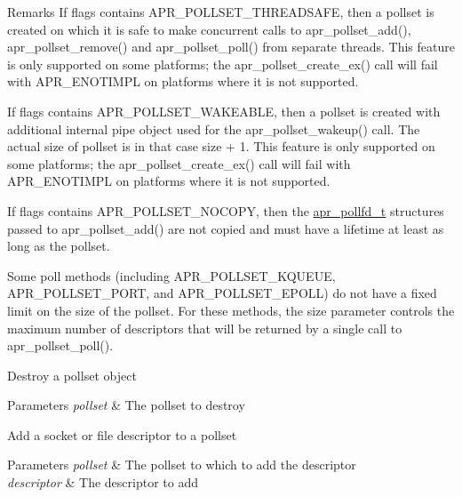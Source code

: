 \begin{DoxyRemark}{Remarks}
If flags contains A\+P\+R\+\_\+\+P\+O\+L\+L\+S\+E\+T\+\_\+\+T\+H\+R\+E\+A\+D\+S\+A\+FE, then a pollset is created on which it is safe to make concurrent calls to apr\+\_\+pollset\+\_\+add(), apr\+\_\+pollset\+\_\+remove() and apr\+\_\+pollset\+\_\+poll() from separate threads. This feature is only supported on some platforms; the apr\+\_\+pollset\+\_\+create\+\_\+ex() call will fail with A\+P\+R\+\_\+\+E\+N\+O\+T\+I\+M\+PL on platforms where it is not supported. 

If flags contains A\+P\+R\+\_\+\+P\+O\+L\+L\+S\+E\+T\+\_\+\+W\+A\+K\+E\+A\+B\+LE, then a pollset is created with additional internal pipe object used for the apr\+\_\+pollset\+\_\+wakeup() call. The actual size of pollset is in that case size + 1. This feature is only supported on some platforms; the apr\+\_\+pollset\+\_\+create\+\_\+ex() call will fail with A\+P\+R\+\_\+\+E\+N\+O\+T\+I\+M\+PL on platforms where it is not supported. 

If flags contains A\+P\+R\+\_\+\+P\+O\+L\+L\+S\+E\+T\+\_\+\+N\+O\+C\+O\+PY, then the \hyperlink{structapr__pollfd__t}{apr\+\_\+pollfd\+\_\+t} structures passed to apr\+\_\+pollset\+\_\+add() are not copied and must have a lifetime at least as long as the pollset. 

Some poll methods (including A\+P\+R\+\_\+\+P\+O\+L\+L\+S\+E\+T\+\_\+\+K\+Q\+U\+E\+UE, A\+P\+R\+\_\+\+P\+O\+L\+L\+S\+E\+T\+\_\+\+P\+O\+RT, and A\+P\+R\+\_\+\+P\+O\+L\+L\+S\+E\+T\+\_\+\+E\+P\+O\+LL) do not have a fixed limit on the size of the pollset. For these methods, the size parameter controls the maximum number of descriptors that will be returned by a single call to apr\+\_\+pollset\+\_\+poll().
\end{DoxyRemark}
Destroy a pollset object 
\begin{DoxyParams}{Parameters}
{\em pollset} & The pollset to destroy\\
\hline
\end{DoxyParams}
Add a socket or file descriptor to a pollset 
\begin{DoxyParams}{Parameters}
{\em pollset} & The pollset to which to add the descriptor \\
\hline
{\em descriptor} & The descriptor to add \\
\hline
\end{DoxyParams}
